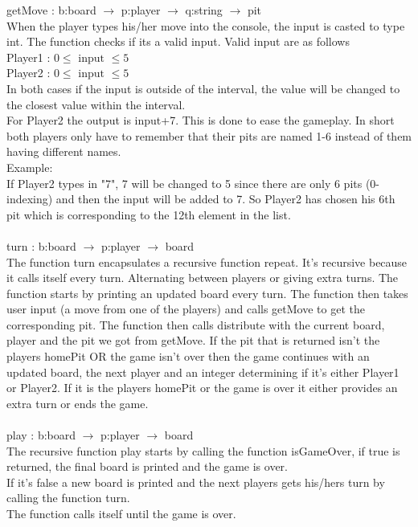 \documentclass{article}
\begin{document}
getMove : b:board $\rightarrow$ p:player $\rightarrow$ q:string $\rightarrow$ pit\\
When the player types his/her move into the console, the input is casted to type int. The function checks if its a valid input. Valid input are as follows\\
Player1 : $0 \leq \text{ input } \leq 5$\\
Player2 : $0 \leq \text{ input } \leq 5$\\
In both cases if the input is outside of the interval, the value will be changed to the closest value within the interval.\\
For Player2 the output is input+7. This is done to ease the gameplay. In short both players only have to remember that their pits are named 1-6 instead of them having different names.\\
Example:\\
If Player2 types in "7", 7 will be changed to 5 since there are only 6 pits (0-indexing) and then the input will be added to 7. So Player2 has chosen his 6th pit which is corresponding to the 12th element in the list.\\
\\
turn : b:board $\rightarrow$ p:player $\rightarrow$ board\\
The function turn encapsulates a recursive function repeat. It's recursive because it calls itself every turn. Alternating between players or giving extra turns. The function starts by printing an updated board every turn. The function then takes user input (a move from one of the players) and calls getMove to get the corresponding pit. The function then calls distribute with the current board, player and the pit we got from getMove. If the pit that is returned isn't the players homePit OR the game isn't over then the game continues  with an updated board, the next player and an integer determining if it's either Player1 or Player2. If it is the players homePit or the game is over it either provides an extra turn or ends the game.\\
\\
play : b:board $\rightarrow$ p:player $\rightarrow$ board\\
The recursive function play starts by calling the function isGameOver, if true is returned, the final board is printed and the game is over.\\
If it's false a new board is printed and the next players gets his/hers turn by calling the function turn.\\
The function calls itself until the game is over.
\end{document}
